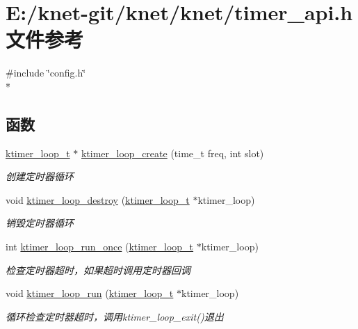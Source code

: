 \hypertarget{a00096}{}\section{E\+:/knet-\/git/knet/knet/timer\+\_\+api.h 文件参考}
\label{a00096}
{\ttfamily \#include \char`\"{}config.\+h\char`\"{}}\\*
\subsection*{函数}
\begin{DoxyCompactItemize}
\item 
\hyperlink{a00050_a024af2aa29615e7a811ea6c45438157d_a024af2aa29615e7a811ea6c45438157d}{ktimer\+\_\+loop\+\_\+t} $\ast$ \hyperlink{a00108_gaef96e7c368db456236a2121e3d75c49c_gaef96e7c368db456236a2121e3d75c49c}{ktimer\+\_\+loop\+\_\+create} (time\+\_\+t freq, int slot)
\begin{DoxyCompactList}\small\item\em 创建定时器循环 \end{DoxyCompactList}\item 
void \hyperlink{a00108_gad3dafe93f5b45424bd5983ef0c163687_gad3dafe93f5b45424bd5983ef0c163687}{ktimer\+\_\+loop\+\_\+destroy} (\hyperlink{a00050_a024af2aa29615e7a811ea6c45438157d_a024af2aa29615e7a811ea6c45438157d}{ktimer\+\_\+loop\+\_\+t} $\ast$ktimer\+\_\+loop)
\begin{DoxyCompactList}\small\item\em 销毁定时器循环 \end{DoxyCompactList}\item 
int \hyperlink{a00108_gaf195cf4006bced494e99242c36ad36c0_gaf195cf4006bced494e99242c36ad36c0}{ktimer\+\_\+loop\+\_\+run\+\_\+once} (\hyperlink{a00050_a024af2aa29615e7a811ea6c45438157d_a024af2aa29615e7a811ea6c45438157d}{ktimer\+\_\+loop\+\_\+t} $\ast$ktimer\+\_\+loop)
\begin{DoxyCompactList}\small\item\em 检查定时器超时，如果超时调用定时器回调 \end{DoxyCompactList}\item 
void \hyperlink{a00108_ga5e31b2fc26af005e97b09804c5a98099_ga5e31b2fc26af005e97b09804c5a98099}{ktimer\+\_\+loop\+\_\+run} (\hyperlink{a00050_a024af2aa29615e7a811ea6c45438157d_a024af2aa29615e7a811ea6c45438157d}{ktimer\+\_\+loop\+\_\+t} $\ast$ktimer\+\_\+loop)
\begin{DoxyCompactList}\small\item\em 循环检查定时器超时，调用ktimer\+\_\+loop\+\_\+exit()退出 \end{DoxyCompactList}\item 

\end{DoxyCompactItemize}
